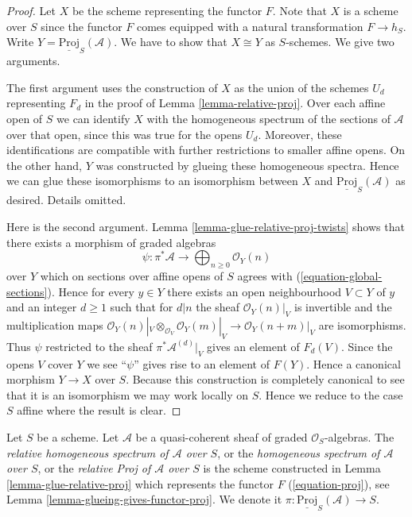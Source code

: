 \begin{proof}
Let $X$ be the scheme representing the functor $F$.
Note that $X$ is a scheme over $S$ since the functor $F$
comes equipped with a natural transformation $F \to h_S$.
Write $Y = \underline{\text{Proj}}_S(\mathcal{A})$.
We have to show that $X \cong Y$ as $S$-schemes.
We give two arguments.

\medskip\noindent
The first argument uses the construction of $X$ as the union
of the schemes $U_d$ representing $F_d$ in the
proof of Lemma \ref{lemma-relative-proj}.
Over each affine open of $S$ we can identify $X$ with the homogeneous spectrum
of the sections of $\mathcal{A}$ over that open, since this was
true for the opens $U_d$. Moreover, these identifications
are compatible with further restrictions to smaller affine opens.
On the other hand, $Y$ was constructed by glueing these
homogeneous spectra.
Hence we can glue these isomorphisms to an isomorphism
between $X$ and $\underline{\text{Proj}}_S(\mathcal{A})$ as
desired. Details omitted.

\medskip\noindent
Here is the second argument.
Lemma \ref{lemma-glue-relative-proj-twists}
shows that there exists a morphism of graded algebras
$$
\psi : \pi^*\mathcal{A}
\longrightarrow
\bigoplus\nolimits_{n \geq 0} \mathcal{O}_Y(n)
$$
over $Y$ which on sections over affine opens of $S$ agrees with
(\ref{equation-global-sections}). Hence for every $y \in Y$
there exists an open neighbourhood $V \subset Y$ of $y$
and an integer $d \geq 1$ such that for $d | n$ the sheaf
$\mathcal{O}_Y(n)|_V$ is invertible and the multiplication maps
$\mathcal{O}_Y(n)|_V \otimes_{\mathcal{O}_V} \mathcal{O}_Y(m)|_V
\to \mathcal{O}_Y(n + m)|_V$ are isomorphisms. Thus
$\psi$ restricted to the sheaf $\pi^*\mathcal{A}^{(d)}|_V$
gives an element of $F_d(V)$. Since the opens $V$ cover $Y$
we see ``$\psi$'' gives rise to an element of $F(Y)$.
Hence a canonical morphism $Y \to X$ over $S$.
Because this construction is completely canonical to see
that it is an isomorphism we may work locally on $S$.
Hence we reduce to the case $S$ affine where the result is clear.
\end{proof}

\begin{definition}
\label{definition-relative-proj}
Let $S$ be a scheme. Let $\mathcal{A}$ be a quasi-coherent sheaf of
graded $\mathcal{O}_S$-algebras. The
{\it relative homogeneous spectrum of $\mathcal{A}$ over $S$},
or the {\it homogeneous spectrum of $\mathcal{A}$ over $S$}, or the
{\it relative Proj of $\mathcal{A}$ over $S$} is the scheme
constructed in Lemma \ref{lemma-glue-relative-proj} which represents the
functor $F$ (\ref{equation-proj}), see
Lemma \ref{lemma-glueing-gives-functor-proj}.
We denote it $\pi : \underline{\text{Proj}}_S(\mathcal{A}) \to S$.
\end{definition}

